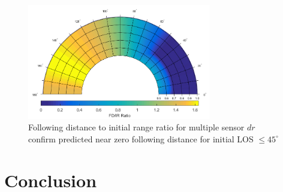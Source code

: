 \documentclass[conference]{IEEEtran}
\begin{document}
\begin{figure}[H]
	\centering
	\includegraphics[width=8cm]{correctpolar.png}
	\caption{Following distance to initial range ratio for multiple sensor $dr$ confirm predicted near zero following distance for initial LOS $\leq45^\circ$}
	\label{fig:Polar}
\end{figure}

\section{Conclusion}



\end{document}
